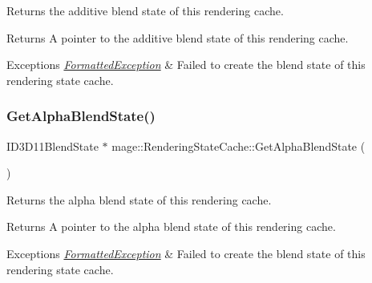 Returns the additive blend state of this rendering cache.

\begin{DoxyReturn}{Returns}
A pointer to the additive blend state of this rendering cache. 
\end{DoxyReturn}

\begin{DoxyExceptions}{Exceptions}
{\em \hyperlink{structmage_1_1_formatted_exception}{Formatted\+Exception}} & Failed to create the blend state of this rendering state cache. \\
\hline
\end{DoxyExceptions}
\hypertarget{structmage_1_1_rendering_state_cache_a19ad72ad35096722e3d61e58e0ab9205}{}\label{structmage_1_1_rendering_state_cache_a19ad72ad35096722e3d61e58e0ab9205} 
\subsubsection{\texorpdfstring{Get\+Alpha\+Blend\+State()}{GetAlphaBlendState()}}
{\footnotesize\ttfamily I\+D3\+D11\+Blend\+State $\ast$ mage\+::\+Rendering\+State\+Cache\+::\+Get\+Alpha\+Blend\+State (\begin{DoxyParamCaption}{ }\end{DoxyParamCaption})}

Returns the alpha blend state of this rendering cache.

\begin{DoxyReturn}{Returns}
A pointer to the alpha blend state of this rendering cache. 
\end{DoxyReturn}

\begin{DoxyExceptions}{Exceptions}
{\em \hyperlink{structmage_1_1_formatted_exception}{Formatted\+Exception}} & Failed to create the blend state of this rendering state cache. \\
\hline
\end{DoxyExceptions}
\hypertarget{structmage_1_1_rendering_state_cache_a736e11f05e6721ef2e7e1951a4216079}{}\label{structmage_1_1_rendering_state_cache_a736e11f05e6721ef2e7e1951a4216079} 
